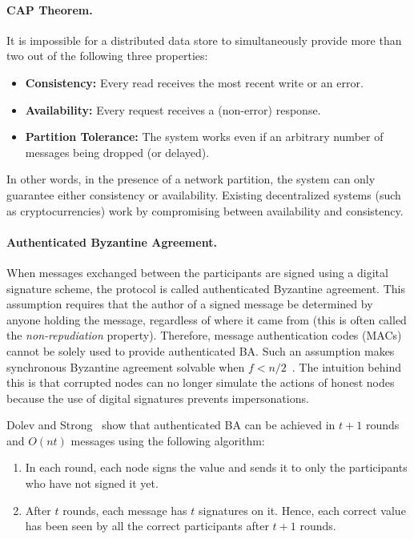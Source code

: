 \documentclass[11pt]{article}
\theoremstyle{mytheoremstyle}
\begin{document}
\paragraph{CAP Theorem.} It is impossible for a distributed data store to simultaneously provide more than two out of the following three properties: 
\begin{itemize}
	\item \textbf{Consistency:} Every read receives the most recent write or an error.
	\item \textbf{Availability:} Every request receives a (non-error) response.
	\item \textbf{Partition Tolerance:} The system works even if an arbitrary number of messages being dropped (or delayed).
\end{itemize}
In other words, in the presence of a network partition, the system can only guarantee either consistency or availability. Existing decentralized systems (such as cryptocurrencies) work by compromising between availability and consistency.

\paragraph{Authenticated Byzantine Agreement.}
When messages exchanged between the participants are signed using a digital signature scheme, the protocol is called authenticated Byzantine agreement. This assumption requires that the author of a signed message be determined by anyone holding the message, regardless of where it came from (this is often called the \emph{non-repudiation} property). Therefore, message authentication codes (MACs) cannot be solely used to provide authenticated BA. Such an assumption makes synchronous Byzantine agreement solvable when $f<n/2$~\cite{srini2017}. The intuition behind this is that corrupted nodes can no longer simulate the actions of honest nodes because the use of digital signatures prevents impersonations.

Dolev and Strong~\cite{Dolev:Strong:83} show that authenticated BA can be achieved in $t+1$ rounds and $O(nt)$ messages using the following algorithm:

\begin{enumerate}
	\item In each round, each node signs the value and sends it to only the participants who have not signed it yet.
	\item After $t$ rounds, each message has $t$ signatures on it. Hence, each correct value has been seen by all the correct participants after $t+1$ rounds.
\end{enumerate}
\end{document}

